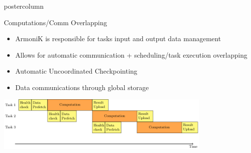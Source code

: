 \begin{frame}[fragile]
\begin{columns}[T]
\begin{column}{.49\textwidth}
\begin{beamercolorbox}[center,wd=\textwidth]{postercolumn}
\begin{minipage}[T]{.96\textwidth}
            \begin{block}{Computations/Comm Overlapping}
                \begin{itemize}
                \item ArmoniK is responsible for tasks input and output data management
                \item Allows for automatic communication + scheduling/task execution overlapping
                \item Automatic Uncoordinated Checkpointing
                \item Data communications through global storage
                \end{itemize}
                \vspace{3ex}
                \includegraphics[width=0.8\textwidth]{armonik_pipelining.pdf}
            \end{block}


\end{minipage}
\end{beamercolorbox}
\end{column}
\end{columns}
\end{frame}
